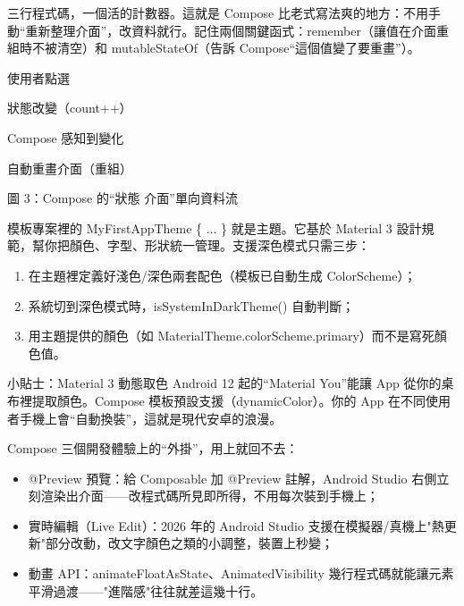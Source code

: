 三行程式碼，一個活的計數器。這就是 Compose 比老式寫法爽的地方：不用手動“重新整理介面”，改資料就行。記住兩個關鍵函式：remember（讓值在介面重組時不被清空）和 mutableStateOf（告訴 Compose“這個值變了要重畫”）。

使用者點選

狀態改變（count++）

Compose 感知到變化

自動重畫介面（重組）

\begin{center}\small\color{gray}圖 3：Compose 的“狀態 介面”單向資料流\end{center}


模板專案裡的 MyFirstAppTheme \{ ... \} 就是主題。它基於 Material 3 設計規範，幫你把顏色、字型、形狀統一管理。支援深色模式只需三步：

\begin{enumerate}
  \item 在主題裡定義好淺色/深色兩套配色（模板已自動生成 ColorScheme）；
  \item 系統切到深色模式時，isSystemInDarkTheme() 自動判斷；
  \item 用主題提供的顏色（如 MaterialTheme.colorScheme.primary）而不是寫死顏色值。
\end{enumerate}

\begin{tcbinfo}{小貼士：Material 3 動態取色}
Android 12 起的“Material You”能讓 App 從你的桌布裡提取顏色。Compose 模板預設支援（dynamicColor）。你的 App 在不同使用者手機上會“自動換裝”，這就是現代安卓的浪漫。

\end{tcbinfo}


Compose 三個開發體驗上的“外掛”，用上就回不去：

\begin{itemize}
  \item @Preview 預覽：給 Composable 加 @Preview 註解，Android Studio 右側立刻渲染出介面——改程式碼所見即所得，不用每次裝到手機上；
  \item 實時編輯（Live Edit）：2026 年的 Android Studio 支援在模擬器/真機上"熱更新"部分改動，改文字顏色之類的小調整，裝置上秒變；
  \item 動畫 API：animateFloatAsState、AnimatedVisibility 幾行程式碼就能讓元素平滑過渡——"進階感"往往就差這幾十行。
\end{itemize}

